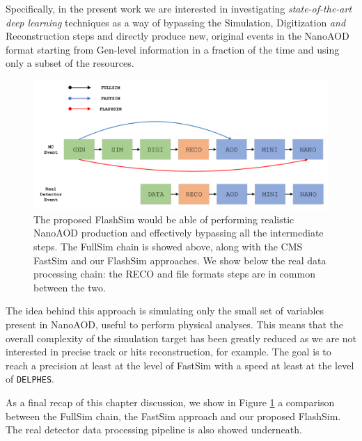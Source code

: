 Specifically, in the present work we are interested in investigating \emph{state-of-the-art deep learning} techniques as a way of bypassing the Simulation, Digitization \emph{and} Reconstruction steps and directly produce new, original events in the NanoAOD format starting from Gen-level information in a fraction of the time and using only a subset of the resources.

\begin{figure}
    \centering
    \includegraphics[width=\columnwidth]{gfx/ch2/sim_comp.pdf}
    \caption[Simulation comparison]{The proposed FlashSim would be able of performing realistic NanoAOD production and effectively bypassing all the intermediate steps. The FullSim chain is showed above, along with the CMS FastSim and our FlashSim approaches. We show below the real data processing chain: the RECO and file formats steps are in common between the two.}
    \label{fig:sim_comp}
\end{figure}

The idea behind this approach is simulating only the small set of variables present in NanoAOD, useful to perform physical analyses. This means that the overall complexity of the simulation target has been greatly reduced as we are not interested in precise track or hits reconstruction, for example. The goal is to reach a precision at least at the level of FastSim with a speed at least at the level of \texttt{DELPHES}.

As a final recap of this chapter discussion, we show in Figure \ref{fig:sim_comp} a comparison between the FullSim chain, the FastSim approach and our proposed FlashSim. The real detector data processing pipeline is also showed underneath.
